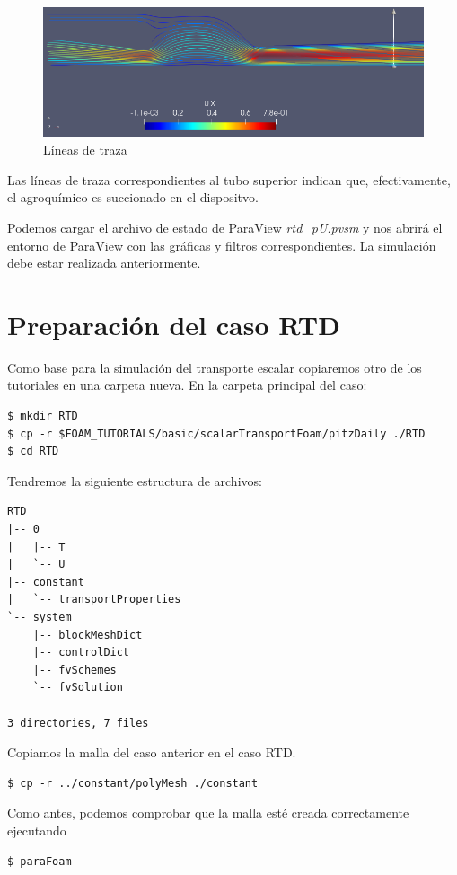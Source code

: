 \documentclass{article}
\begin{document}
\begin{figure}[h!]
\centering
\includegraphics[width=1\textwidth]{Figuras/stream_vel.png}
\caption{Líneas de traza}
\label{fig:stream_vel}
\end{figure}

Las líneas de traza correspondientes al tubo superior indican que, efectivamente, el agroquímico es succionado en el dispositvo. 

Podemos cargar el archivo de estado de ParaView \textit{rtd\_pU.pvsm} y nos abrirá el entorno de ParaView con las gráficas y filtros correspondientes. La simulación debe estar realizada anteriormente.

\section{Preparación del caso RTD}
Como base para la simulación del transporte escalar copiaremos otro de los tutoriales en una carpeta nueva. En la carpeta principal del caso:
\begin{lstlisting}
$ mkdir RTD
$ cp -r $FOAM_TUTORIALS/basic/scalarTransportFoam/pitzDaily ./RTD
$ cd RTD
\end{lstlisting}

Tendremos la siguiente estructura de archivos:
\begin{lstlisting}
RTD
|-- 0
|   |-- T
|   `-- U
|-- constant
|   `-- transportProperties
`-- system
    |-- blockMeshDict
    |-- controlDict
    |-- fvSchemes
    `-- fvSolution

3 directories, 7 files
\end{lstlisting}

Copiamos la malla del caso anterior en el caso RTD.
\begin{lstlisting}
$ cp -r ../constant/polyMesh ./constant
\end{lstlisting}

Como antes, podemos comprobar que la malla esté creada correctamente ejecutando
\begin{lstlisting}
$ paraFoam
\end{lstlisting}
\end{document}
